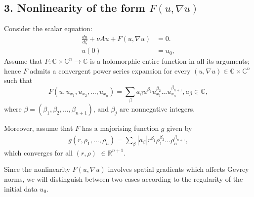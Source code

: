 \documentclass[12pt]{article}
\theoremstyle{plain}
\theoremstyle{remark}
\begin{document}
\subsection*{3. Nonlinearity of the form  \( F(u,\nabla u) \) }
Consider the scalar equation:
\begin{align}
    \frac{du}{d\zeta} + \nu Au + F(u,\nabla u) &= 0 .\label{20}\\
    u(0) &= u_0,  \label{21}
\end{align}
Assume that \(F : \mathbb{C}\times \mathbb{C}^{n} \to \mathbb{C}
\)  is a holomorphic entire function in all its arguments; hence $F$ admits a convergent power series expansion for every $(u,\nabla u)\in\mathbb{C}\times \mathbb{C}^{n} $ such that
\[
F(u,u_{x_1},u_{x_2},...,u_{x_n})=\sum_\beta a_\beta u^{\beta_ 1}u^{\beta_ 2}_{x_1}...u^{\beta_{n+1}}_{x_n}, a_\beta \in \mathbb{C},
\]
where $\beta=(\beta_1, \beta_2, ..., \beta_{n+1})$, and $\beta_j$ are nonnegative integers.

Moreover, assume that $F$ has a majorising function $g$  given by
\begin{align}
    g(r,\rho_1,...,\rho_n)=\sum_\beta |a_\beta| r^{\beta_ 1}\rho_1^{\beta_ 2}...\rho_n^{\beta_{n+1}}, \label{22}
\end{align}
which converges for all $(r,\rho)$ $\in \mathbb{R}^{n+1}$.

Since the nonlinearity $F(u,\nabla u)$ involves spatial gradients which  affects Gevrey norms, we will distinguish between two cases according to the regularity of the initial data $u_0$.
\end{document}
